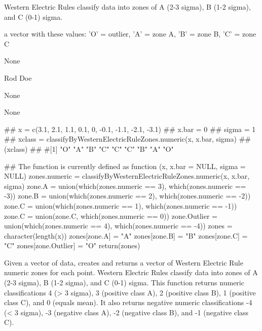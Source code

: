 \documentclass[a4paper]{book}
\begin{document}
%
\begin{Details}\relax
Western Electric Rules classify data into zones of A (2-3 sigma), B (1-2 sigma), and C (0-1) sigma.
\end{Details}
%
\begin{Value}
a vector with these values: 'O' = outlier, 'A' = zone A, 'B' = zone B, 'C' = zone C
\end{Value}
%
\begin{Note}\relax
None
\end{Note}
%
\begin{Author}\relax
Rod Doe
\end{Author}
%
\begin{References}\relax
None
\end{References}
%
\begin{SeeAlso}\relax
None
\end{SeeAlso}
%
\begin{Examples}
\begin{ExampleCode}
## x = c(3.1, 2.1, 1.1, 0.1, 0, -0.1, -1.1, -2.1, -3.1)
## x.bar = 0
## sigma = 1
## xclass = classifyByWesternElectricRuleZones.numeric(x, x.bar, sigma)
## (xclass)
## #[1] "O" "A" "B" "C" "C" "C" "B" "A" "O"

## The function is currently defined as
function (x, x.bar = NULL, sigma = NULL) 
{
    zones.numeric = classifyByWesternElectricRuleZones.numeric(x, 
        x.bar, sigma)
    zone.A = union(which(zones.numeric == 3), which(zones.numeric == 
        -3))
    zone.B = union(which(zones.numeric == 2), which(zones.numeric == 
        -2))
    zone.C = union(which(zones.numeric == 1), which(zones.numeric == 
        -1))
    zone.C = union(zone.C, which(zones.numeric == 0))
    zone.Outlier = union(which(zones.numeric == 4), which(zones.numeric == 
        -4))
    zones = character(length(x))
    zones[zone.A] = "A"
    zones[zone.B] = "B"
    zones[zone.C] = "C"
    zones[zone.Outlier] = "O"
    return(zones)
  }
\end{ExampleCode}
\end{Examples}
%
\begin{Description}\relax
Given a vector of data, creates and returns a vector of Western Electric Rule numeric zones for each point.
Western Electric Rules classify data into zones of A (2-3 sigma), B (1-2 sigma), and C (0-1) sigma.
This function returns numeric classifications 4 (> 3 sigma), 3 (positive class A), 2 (positive class B), 1 (positive class C), and 0 (equals mean).
It also returns negative numeric classifications -4 (< 3 sigma), -3 (negative class A), -2 (negative class B), and -1 (negative class C).
\end{Description}
\end{document}
